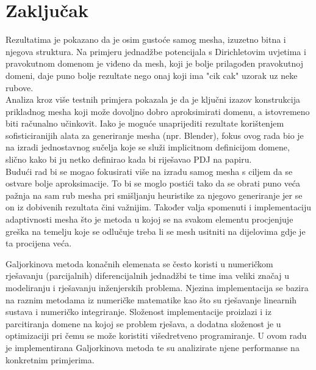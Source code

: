 \documentclass[zavrsnirad]{../fer}
\begin{document}
\chapter{Zaključak}
Rezultatima je pokazano da je osim gustoće samog mesha,
izuzetno bitna i njegova struktura. Na primjeru jednadžbe 
potencijala s Dirichletovim uvjetima i pravokutnom domenom 
je viđeno da mesh, koji je bolje prilagođen pravokutnoj domeni, 
daje puno bolje rezultate nego onaj koji ima "cik cak" uzorak 
uz neke rubove.
\\
Analiza kroz više testnih primjera pokazala je da je ključni izazov konstrukcija 
prikladnog mesha koji može dovoljno dobro aproksimirati domenu,
a istovremeno biti računalno učinkovit.
Iako je moguće unaprijediti rezultate korištenjem
sofisticiranijih alata za generiranje mesha (npr. Blender),
fokus ovog rada bio je na izradi jednostavnog sučelja koje 
se služi implicitnom definicijom domene, slično kako bi 
ju netko definirao kada bi riješavao PDJ na papiru.
\\ 
Budući rad bi se mogao fokusirati više na izradu samog mesha
s ciljem da se ostvare bolje aproksimacije. To bi se moglo 
postići tako da se obrati puno veća pažnja na sam rub mesha 
pri smišljanju heuristike za njegovo generiranje
jer se on iz dobivenih rezultata čini važnijim. 
Također valja spomenuti i implementaciju adaptivnosti mesha 
što je metoda u kojoj se na svakom elementu procjenjuje greška 
na temelju koje se odlučuje treba li se mesh usitniti na 
dijelovima gdje je ta procijena veća.

\label{pog:zakljucak}









\begin{sazetak}
Galjorkinova metoda konačnih elemenata se često koristi
u numeričkom rješavanju (parcijalnih) diferencijalnih
jednadžbi te time ima veliki značaj u modeliranju i
rješavanju inženjerskih problema. Njezina implementacija
se bazira na raznim metodama iz numeričke matematike kao što
su rješavanje linearnih sustava i numeričko integriranje.
Složenost implementacije proizlazi i iz parcitiranja domene
na kojoj se problem rješava, a dodatna složenost je u optimizaciji
pri čemu se može koristiti višedretveno programiranje.
U ovom radu je implementirana Galjorkinova metoda te su
analizirate njene performanse na konkretnim primjerima.
\end{sazetak}
\end{document}
